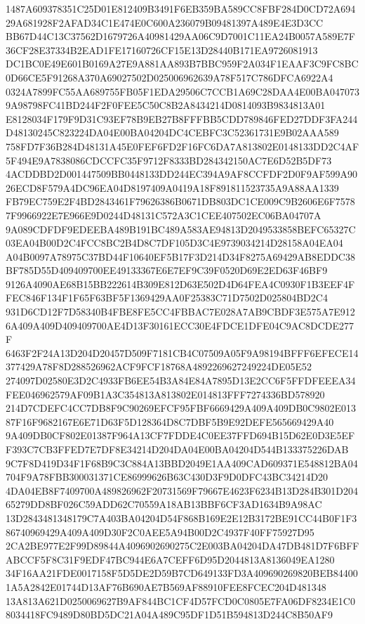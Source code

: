 \documentclass[UTF8,fontset=fandol,zihao=-4,a4paper]{ctexart}
\begin{document}
{{1487A609378351C25D01E812409B3491F6EB359BA589CC8FBF284D0CD72A69429A681928F2AFAD34C1E474E0C600A236079B09481397A489E4E3D3CC
BB67D44C13C37562D1679726A40981429AA06C9D7001C11EA24B0057A589E7F36CF28E37334B2EAD1FE17160726CF15E13D28440B171EA9726081913
DC1BC0E49E601B0169A27E9A881AA893B7BBC959F2A034F1EAAF3C9FC8BC0D66CE5F91268A370A69027502D025006962639A78F517C786DFCA6922A4
0324A7899FC55AA689755FB05F1EDA29506C7CCB1A69C28DAA4E00BA0470739A98798FC41BD244F2F0FEE5C50C8B2A8434214D0814093B9834813A01
E8128034F179F9D31C93EF78B9EB27B8FFFBB5CDD789846FED27DDF3FA244D48130245C823224DA04E00BA04204DC4CEBFC3C52361731E9B02AAA589
758FD7F36B284D48131A45E0FEF6FD2F16FC6DA7A813802E0148133DD2C4AF5F494E9A7838086CDCCFC35F9712F8333BD284342150AC7E6D52B5DF73
4ACDDBD2D001447509BB0448133DD244EC394A9AF8CCFDF2D0F9AF599A9026ECD8F579A4DC96EA04D8197409A0419A18F891811523735A9A88AA1339
FB79EC759E2F4BD2843461F79626386B0671DB803DC1CE009C9B2606E6F75787F9966922E7E966E9D0244D48131C572A3C1CEE407502EC06BA04707A
9A089CDFDF9EDEEBA489B191BC489A583AE94813D2049533858BEFC65327C03EA04B00D2C4FCC8BC2B4D8C7DF105D3C4E9739034214D28158A04EA04
A04B0097A78975C37BD44F10640EF5B17F3D214D34F8275A69429AB8EDDC38BF785D55D409409700EE49133367E6E7EF9C39F0520D69E2ED63F46BF9
9126A4090AE68B15BB222614B309E812D63E502D4D64FEA4C0930F1B3EEF4FFEC846F134F1F65F63BF5F1369429AA0F25383C71D7502D025804BD2C4
931D6CD12F7D58340B4FBE8FE5CC4FBBAC7E028A7AB9CBDF3E575A7E9126A409A409D409409700AE4D13F30161ECC30E4FDCE1DFE04C9AC8DCDE277F
6463F2F24A13D204D20457D509F7181CB4C07509A05F9A98194BFFF6EFECE14377429A78F8D288526962ACF9FCF18768A4892269627249224DE05E52
274097D02580E3D2C4933FB6EE54B3A84E84A7895D13E2CC6F5FFDFEEEA34FEE046962579AF09B1A3C354813A813802E014813FFF7274336BD578920
214D7CDEFC4CC7DB8F9C90269EFCF95FBF6669429A409A409DB0C9802E01387F16F9682167E6E71D63F5D128364D8C7DBF5B9E92DEFE565669429A40
9A409DB0CF802E01387F964A13CF7FDDE4C0EE37FFD694B15D62E0D3E5EFF393C7CB3FFED7E7DF8E34214D204DA04E00BA04204D544B133375226DAB
9C7F8D419D34F1F68B9C3C884A13BBD2049E1AA409CAD609371E548812BA04704F9A78FBB300031371CE86999626B63C430D3F9D0DFC43BC34214D20
4DA04EB8F7409700A489826962F20731569F79667E4623F6234B13D284B301D20465279DD8BF026C59ADD62C70559A18AB13BBF6CF3AD1634B9A98AC
13D2843481348179C7A403BA04204D54F868B169E2E12B3172BE91CC44B0F1F386740969429A409A409D30F2C0AEE5A94B00D2C4937F40FF75927D95
2CA2BE977E2F99D89844A4096902690275C2E003BA04204DA47DB481D7F6BFFABCCF5F8C31F9EDF47BC944E6A7CEFF6D95D2044813A8136049EA1280
34F16AA21FDE0017158F5D5DE2D59B7CD649133FD3A409690269820BEB844001A5A2842E01744D13AF76B690AE7B569AF88910FEE8FCEC204D481348
13A813A621D0250069627B9AF844BC1CF4D57FCD0C0805E7FA06DF8234E1C08034418FC9489D80BD5DC21A04A489C95DF1D51B594813D244C8B50AF9
}}
\end{document}

